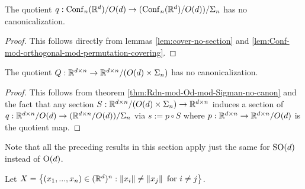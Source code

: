 \begin{theorem}\label{thm:Rdn-mod-Od-mod-Sigman-no-canon}
    The quotient $q : \operatorname{Conf}_n(\mathbb{R}^d)/O(d) \to (\operatorname{Conf}_n(\mathbb{R}^d)/O(d))/\Sigma_n$ has no canonicalization.
    \begin{proof}
        This follows directly from lemmas \ref{lem:cover-no-section} and \ref{lem:Conf-mod-orthogonal-mod-permutation-covering}.
    \end{proof}
\end{theorem}


\begin{corollary}\label{cor:Rdn-mod-Od-Sigman-no-canon}
    The quotient $Q : \mathbb{R}^{d \times n} \to \mathbb{R}^{d \times n}/(O(d) \times \Sigma_n)$ has no canonicalization.
    \begin{proof}
        This follows from theorem \ref{thm:Rdn-mod-Od-mod-Sigman-no-canon} and the fact that any section $S : \mathbb{R}^{d \times n}/(O(d) \times \Sigma_n) \to \mathbb{R}^{d \times n}$ induces a section of $q : \mathbb{R}^{d \times n}/O(d) \to (\mathbb{R}^{d \times n} / O(d))/\Sigma_n$ via $s := p \circ S$ where $p : \mathbb{R}^{d \times n} \to \mathbb{R}^{d \times n}/O(d)$ is the quotient map.
    \end{proof}
\end{corollary}

Note that all the preceding results in this section apply just the same for $\operatorname{SO}(d)$ instead of $\operatorname{O}(d)$.

\begin{theorem}
    Let $X = \left\{ (x_1,...,x_n) \in (\mathbb{R}^d)^n : \left\| x_i \right\| \neq \left\| x_j \right\| \text{ for } i \neq j \right\}$.
\end{theorem}

